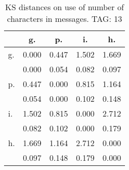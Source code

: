 \begin{table}[h!]
\begin{center}
\begin{tabular}{| l | c | c | c | c |}\hline
 & g. & p. & i. & h. \\\hline
g. & 0.000  & 0.447  & 1.502  & 1.669 \\\hline
 & 0.000  & 0.054  & 0.082  & 0.097 \\\hline
p. & 0.447  & 0.000  & 0.815  & 1.164 \\\hline
 & 0.054  & 0.000  & 0.102  & 0.148 \\\hline
i. & 1.502  & 0.815  & 0.000  & 2.712 \\\hline
 & 0.082  & 0.102  & 0.000  & 0.179 \\\hline
h. & 1.669  & 1.164  & 2.712  & 0.000 \\\hline
 & 0.097  & 0.148  & 0.179  & 0.000 \\\hline
\end{tabular}
\caption{KS distances on use of number of characters in messages. TAG: 13}
\end{center}
\end{table}